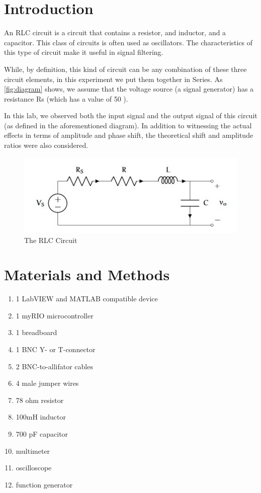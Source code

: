 \documentclass[10pt,twocolumn]{article}
\begin{document}
\section{Introduction} 
\label{sec:introduction}

An RLC circuit is a circuit that contains a resistor, and inductor, and a capacitor. This class of circuits is often used as oscillators. The characteristics of this type of circuit make it useful in signal filtering.

While, by definition, this kind of circuit can be any combination of these three circuit elements, in this experiment we put them together in Series. As \autoref{fig:diagram} shows, we assume that the voltage source (a signal generator) has a resistance Rs (which has a value of 50 \Omega).

In this lab, we observed both the input signal and the output signal of this circuit (as defined in the aforementioned diagram). In addition to witnessing the actual effects in terms of amplitude and phase shift, the theoretical shift and amplitude ratios were also considered.

\begin{figure}[bt]
	\centering
	\includegraphics[width=.9\linewidth]{figures/RLCDiagram.JPG}
	\caption{The RLC Circuit}
	\label{fig:diagram}
\end{figure}

\section{Materials and Methods}

\begin{enumerate}
\item 
1 LabVIEW and MATLAB compatible device 
\item 
1 myRIO microcontroller
\item
1 breadboard
\item
1 BNC Y- or T-connector
\item
2 BNC-to-allifator cables
\item
4 male jumper wires
\item
78 ohm resistor
\item
100mH inductor
\item
700 pF capacitor
\item
multimeter
\item
oscilloscope
\item
function generator
\end{enumerate}
\end{document}
